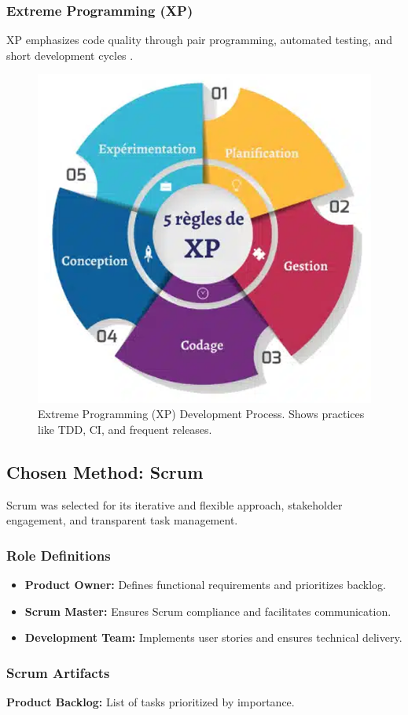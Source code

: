 \subsubsection{Extreme Programming (XP)}
XP emphasizes code quality through pair programming, automated testing, and short development cycles \cite{beck2004xp}.

\begin{figure}[H]
    \centering
    \includegraphics[width=0.55\columnwidth]{img/architecture/Extreme Programming.png}
    \caption{Extreme Programming (XP) Development Process. Shows practices like TDD, CI, and frequent releases.}
    \label{fig:xp_process}
\end{figure}

\subsection{Chosen Method: Scrum}
Scrum was selected for its iterative and flexible approach, stakeholder engagement, and transparent task management.

\subsubsection{Role Definitions}
\begin{itemize}
  \item \textbf{Product Owner:} Defines functional requirements and prioritizes backlog.
  \item \textbf{Scrum Master:} Ensures Scrum compliance and facilitates communication.
  \item \textbf{Development Team:} Implements user stories and ensures technical delivery.
\end{itemize}

\subsubsection{Scrum Artifacts}
\textbf{Product Backlog:} List of tasks prioritized by importance.  

